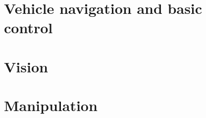 \documentclass[10pt]{article}
\begin{document}
\maketitle

\tableofcontents

\section{Vehicle navigation and basic control}














\section{Vision}








\section{Manipulation}






\end{document}
